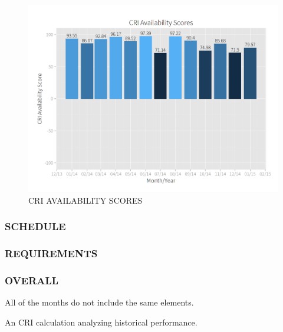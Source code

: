 \documentclass[SDSUThesis.tex]{subfiles}
\begin{document}
            \begin{figure}[ht]
                \centering
                \includegraphics[scale=.3]{images/availability_scores.png}
                \caption{CRI AVAILABILITY SCORES}
                \label{fig:availability-scores}
            \end{figure}
            
            
            
            
            
        \subsubsection{SCHEDULE}
        \subsubsection{REQUIREMENTS}
        \subsubsection{OVERALL}
            All of the months do not include the same elements.  
    
    An CRI calculation analyzing historical performance.


\end{document}

